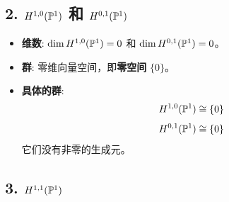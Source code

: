 \documentclass{amsart}
\let\originalmathbb\mathbb
\renewcommand{\mathbb}[1]{%
    \ifstrequal{#1}{1}{\mathbbm{#1}}{\originalmathbb{#1}}%
}
\theoremstyle{plain}
\theoremstyle{definition}
\theoremstyle{remark}
\begin{document}
\subsection{2. \texorpdfstring{$H^{1,0}(\mathbb{P}^1)$}{H^1,0(P^1)} 和 \texorpdfstring{$H^{0,1}(\mathbb{P}^1)$}{H^0,1(P^1)}}

\begin{itemize}
	\item \textbf{维数}: $\dim H^{1,0}(\mathbb{P}^1) = 0$ 和 $\dim H^{0,1}(\mathbb{P}^1) = 0$。
	\item \textbf{群}: 零维向量空间，即\textbf{零空间} $\{0\}$。
	\item \textbf{具体的群}:
\[
H^{1,0}(\mathbb{P}^1) \cong \{0\}
\]
\[
H^{0,1}(\mathbb{P}^1) \cong \{0\}
\]
它们没有非零的生成元。
\end{itemize}

\subsection{3. \texorpdfstring{$H^{1,1}(\mathbb{P}^1)$}{H^1,1(P^1)}}
\end{document}

